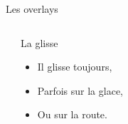 \documentclass[10pt,a4paper]{beamer}
\begin{document}
\begin{frame}{Les overlays}
\begin{columns}[t]
{         }  
        \begin{block}{La glisse}
          \begin{itemize}
          \item Il glisse toujours,          
          \item Parfois sur la glace,          
          \item Ou sur la route.
          \end{itemize}
       \end{block}
  \end{columns}
\end{frame}
\end{document}
